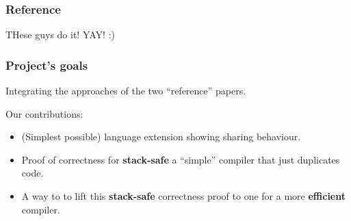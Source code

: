         \begin{frame}
            \frametitle{Reference}
            THese guys do it! YAY! :)
        \end{frame}

        \begin{frame}
            \frametitle{Project's goals}

            Integrating the approaches of the two ``reference'' papers.

            Our contributions:
            \begin{itemize}
                \item (Simplest possible) language extension showing sharing behaviour.
                \item Proof of correctness for \textbf{stack-safe} a ``simple'' compiler that just duplicates code.
                \item A way to to lift this \textbf{stack-safe} correctness proof to one for a more \textbf{efficient} compiler.
            \end{itemize}
        \end{frame}
